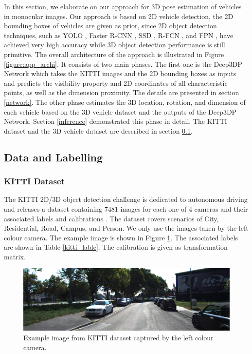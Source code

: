 \documentclass[a4paper,12pt]{article}
\begin{document}
In this section, we elaborate on our approach for 3D pose estimation of vehicles in monocular images. Our approach is based on 2D vehicle detection, \ie the 2D bounding boxes of vehicles are given as prior, since 2D object detection techniques, such as YOLO \cite{DBLP:journals/corr/RedmonF16}, Faster R-CNN \cite{DBLP:journals/corr/RenHG015}, SSD \cite{DBLP:journals/corr/LiuAESR15}, R-FCN \cite{DBLP:journals/corr/DaiLHS16}, and FPN \cite{DBLP:journals/corr/LinDGHHB16},  have achieved very high accuracy while 3D object detection performance is still primitive.  The overall architecture of the approach is illustrated in Figure \ref{figure:app_archi}. It consists of two main phases. The first one is the Deep3DP Network which takes the KITTI images and the 2D bounding boxes as inputs and predicts the visibility property and 2D coordinates of all characteristic points, as well as the dimension proximity. The details are presented in section \ref{network}.  The other phase estimates the 3D location, rotation, and dimension of each vehicle based on the 3D vehicle dataset and the outputs of the Deep3DP Network. Section \ref{inference} demonstrated this phase in detail. The KITTI dataset and the 3D vehicle dataset are described in section \ref{data}.


\subsection{Data and Labelling}
\label{data}
\subsubsection{KITTI Dataset}
The KITTI 2D/3D object detection challenge is dedicated to autonomous driving and releases a dataset containing 7481 images for each one of 4 cameras and their associated labels and calibrations \cite{Geiger2012CVPR}. The dataset covers scenarios of City, Residential, Road, Campus, and Person. We only use the images taken by the left colour camera. The example image is shown in Figure \ref{figure:kitti_image}. The associated labels are shown in Table \ref{kitti_lable}. The calibration is given as transformation matrix.

\begin{figure}[H]		
	\includegraphics[width=1\textwidth]{000010.png}
	\caption[Example image from KITTI dataset.]{Example image from KITTI dataset captured by the left colour camera.}
	\centering
	\label{figure:kitti_image}
\end{figure}
\end{document}
